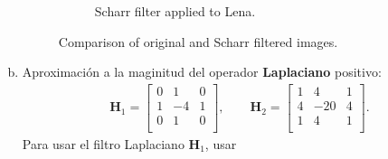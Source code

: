 \documentclass{article}
\theoremstyle{problemstyle}
\begin{document}
\begin{problem}
\begin{enumerate}[a)]
\begin{figure}[H]
\begin{subfigure}{.45\textwidth}
			      \caption{Scharr filter applied to Lena.}
			      \label{fig:lena_scharr}
		      \end{subfigure}
		      \caption{Comparison of original and Scharr filtered images.}
	      \end{figure}
	\item Aproximaci\'on a la maginitud del operador \textbf{Laplaciano} positivo:
	      \begin{align*}
		      \mathbf{H}_{1} = \begin{bmatrix}
			                       0 & 1  & 0 \\
			                       1 & -4 & 1 \\
			                       0 & 1  & 0 \\
		                       \end{bmatrix},
		      \qquad
		      \mathbf{H}_{2} = \begin{bmatrix}
			                       1 & 4   & 1 \\
			                       4 & -20 & 4 \\
			                       1 & 4   & 1 \\
		                       \end{bmatrix}.
	      \end{align*}
Para usar el filtro Laplaciano $ \mathbf{H}_1 $, usar



\end{enumerate}
\end{problem}
\end{document}
